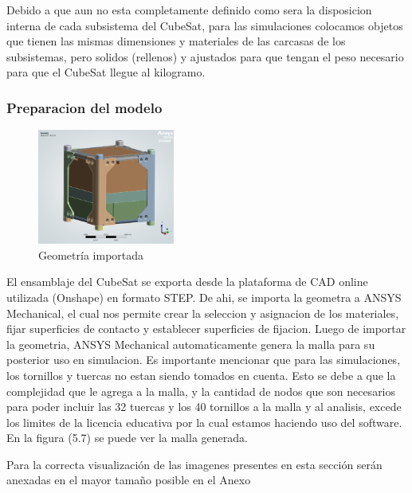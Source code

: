     Debido a que aun no esta completamente definido como sera la disposicion interna de
    cada subsistema del CubeSat, para las simulaciones colocamos objetos que tienen las mismas
    dimensiones y materiales de las carcasas de los subsistemas, pero solidos (rellenos) y ajustados
    para que tengan el peso necesario para que el CubeSat llegue al kilogramo.

    \subsubsection{Preparacion del modelo}

      \noindent
      \begin{minipage}{\textwidth}
        \begin{figure}
          \centering
          \includegraphics[width=0.4\textwidth]{image/fem/ansys_cubesat-geometry.png}
          \caption{Geometría importada}
          \label{fig:fem_geo}
        \end{figure}
        \hspace*{2em}
        El ensamblaje del CubeSat se exporta desde la plataforma de CAD online utilizada (Onshape) en formato
        STEP. De ahi, se importa la geometra a ANSYS Mechanical, el cual nos permite crear la seleccion
        y asignacion de los materiales, fijar superficies de contacto y
        establecer superficies de fijacion. Luego de importar la geometria, ANSYS Mechanical
        automaticamente genera la malla para su posterior uso en simulacion.
        Es importante mencionar que para las simulaciones, los
        tornillos y tuercas no estan siendo tomados en cuenta. Esto se debe a que la complejidad que le agrega
        a la malla, y la cantidad de nodos que son necesarios para poder incluir las 32 tuercas y los 40 tornillos a
        la malla y al analisis, excede los limites de la licencia
        educativa por la cual estamos haciendo uso del software. En la figura (5.7) se puede ver la malla generada.

        Para la correcta visualización de las imagenes presentes en esta sección serán anexadas en el mayor tamaño
        posible en el Anexo
      \end{minipage}

